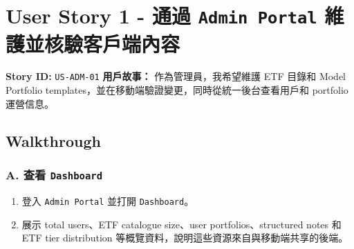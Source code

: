 \section{User Story 1 - 通過 \texttt{Admin Portal} 維護並核驗客戶端內容}
\textbf{Story ID:} \texttt{US-ADM-01}
\textbf{用戶故事：} 作為管理員，我希望維護 ETF 目錄和 Model Portfolio templates，並在移動端驗證變更，同時從統一後台查看用戶和 portfolio 運營信息。
\subsection{Walkthrough}
\subsubsection{A. 查看 \texttt{Dashboard}}
\begin{enumerate}
\item 登入 \texttt{Admin Portal} 並打開 \texttt{Dashboard}。
\item 展示 total users、ETF catalogue size、user portfolios、structured notes 和 ETF tier distribution 等概覽資料，說明這些資源來自與移動端共享的後端。
\end{enumerate}
